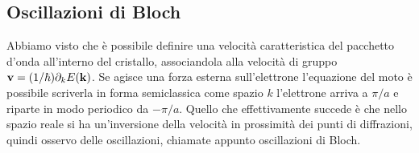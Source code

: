 \documentclass[a4paper,12pt]{article}
\begin{document}
\subsection{Oscillazioni di Bloch}



Abbiamo visto che è possibile definire una velocità caratteristica del pacchetto d'onda all'interno del cristallo, associandola alla velocità di gruppo ${\it\bf v} = (1/\hbar) \partial_kE({\it\bf k})$. Se agisce una forza esterna sull'elettrone l'equazione del moto è possibile scriverla in forma semiclassica come
spazio $k$ l'elettrone arriva a $\pi/a$ e riparte in modo periodico da $-\pi/a$. Quello che effettivamente succede è che nello spazio reale si ha un'inversione della velocità in prossimità dei punti di diffrazioni, quindi osservo delle oscillazioni, chiamate appunto oscillazioni di Bloch.
\end{document}
